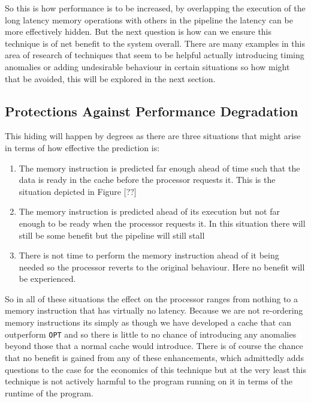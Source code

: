 So this is how performance is to be increased, by overlapping the execution of the long latency memory operations with others in the pipeline the latency can be more effectively hidden. But the next question is how can we ensure this technique is of net benefit to the system overall. There are many examples in this area of research of techniques that seem to be helpful actually introducing timing anomalies or adding undesirable behaviour in certain situations so how might that be avoided, this will be explored in the next section.

\subsection{Protections Against Performance Degradation}

This hiding will happen by degrees as there are three situations that might arise in terms of how effective the prediction is:

\begin{enumerate}[label=\textbf{Situation \arabic*}]
	\item The memory instruction is predicted far enough ahead of time such that the data is ready in the cache before the processor requests it. This is the situation depicted in Figure [??]
	\item The memory instruction is predicted ahead of its execution but not far enough to be ready when the processor requests it. In this situation there will still be some benefit but the pipeline will still stall
	\item There is not time to perform the memory instruction ahead of it being needed so the processor reverts to the original behaviour. Here no benefit will be experienced.
\end{enumerate}

So in all of these situations the effect on the processor ranges from nothing to a memory instruction that has virtually no latency. Because we are not re-ordering memory instructions its simply as though we have developed a cache that can outperform \texttt{OPT} and so there is little to no chance of introducing any anomalies beyond those that a normal cache would introduce. There is of course the chance that no benefit is gained from any of these enhancements, which admittedly adds questions to the case for the economics of this technique but at the very least this technique is not actively harmful to the program running on it in terms of the runtime of the program. 

